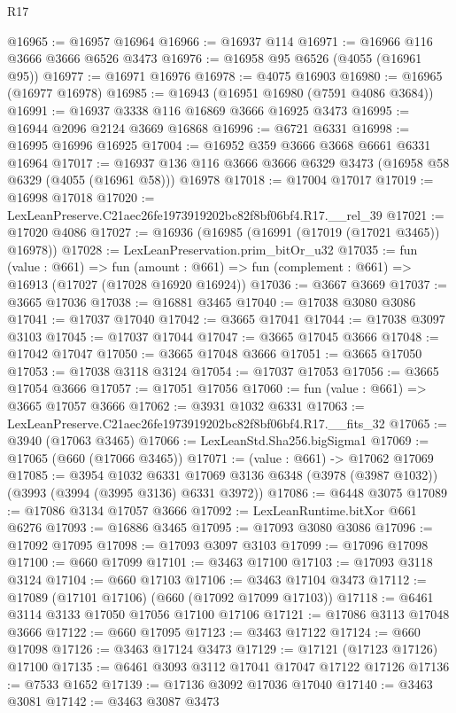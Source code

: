 \begin{lexlean}{R17}
\begin{coremodule}
@16965 := @16957 @16964
@16966 := @16937 @114
@16971 := @16966 @116 @3666 @3666 @6526 @3473
@16976 := @16958 @95 @6526 (@4055 (@16961 @95))
@16977 := @16971 @16976
@16978 := @4075 @16903
@16980 := @16965 (@16977 @16978)
@16985 := @16943 (@16951 @16980 (@7591 @4086 @3684))
@16991 := @16937 @3338 @116 @16869 @3666 @16925 @3473
@16995 := @16944 @2096 @2124 @3669 @16868
@16996 := @6721 @6331
@16998 := @16995 @16996 @16925
@17004 := @16952 @359 @3666 @3668 @6661 @6331 @16964
@17017 := @16937 @136 @116 @3666 @3666 @6329 @3473 (@16958 @58 @6329 (@4055 (@16961 @58))) @16978
@17018 := @17004 @17017
@17019 := @16998 @17018
@17020 := LexLeanPreserve.C21aec26fe1973919202bc82f8bf06bf4.R17.__rel_39
@17021 := @17020 @4086
@17027 := @16936 (@16985 (@16991 (@17019 (@17021 @3465)) @16978))
@17028 := LexLeanPreservation.prim_bitOr_u32
@17035 := fun (value : @661) =>
  fun (amount : @661) => fun (complement : @661) => @16913 (@17027 (@17028 @16920 @16924))
@17036 := @3667 @3669
@17037 := @3665 @17036
@17038 := @16881 @3465
@17040 := @17038 @3080 @3086
@17041 := @17037 @17040
@17042 := @3665 @17041
@17044 := @17038 @3097 @3103
@17045 := @17037 @17044
@17047 := @3665 @17045 @3666
@17048 := @17042 @17047
@17050 := @3665 @17048 @3666
@17051 := @3665 @17050
@17053 := @17038 @3118 @3124
@17054 := @17037 @17053
@17056 := @3665 @17054 @3666
@17057 := @17051 @17056
@17060 := fun (value : @661) => @3665 @17057 @3666
@17062 := @3931 @1032 @6331
@17063 := LexLeanPreserve.C21aec26fe1973919202bc82f8bf06bf4.R17.__fits_32
@17065 := @3940 (@17063 @3465)
@17066 := LexLeanStd.Sha256.bigSigma1
@17069 := @17065 (@660 (@17066 @3465))
@17071 := (value : @661) -> @17062 @17069
@17085 := @3954
    @1032
    @6331
    @17069
    @3136
    @6348
    (@3978 (@3987 @1032))
    (@3993 (@3994 (@3995 @3136) @6331 @3972))
@17086 := @6448 @3075
@17089 := @17086 @3134 @17057 @3666
@17092 := LexLeanRuntime.bitXor @661 @6276
@17093 := @16886 @3465
@17095 := @17093 @3080 @3086
@17096 := @17092 @17095
@17098 := @17093 @3097 @3103
@17099 := @17096 @17098
@17100 := @660 @17099
@17101 := @3463 @17100
@17103 := @17093 @3118 @3124
@17104 := @660 @17103
@17106 := @3463 @17104 @3473
@17112 := @17089 (@17101 @17106) (@660 (@17092 @17099 @17103))
@17118 := @6461 @3114 @3133 @17050 @17056 @17100 @17106
@17121 := @17086 @3113 @17048 @3666
@17122 := @660 @17095
@17123 := @3463 @17122
@17124 := @660 @17098
@17126 := @3463 @17124 @3473
@17129 := @17121 (@17123 @17126) @17100
@17135 := @6461 @3093 @3112 @17041 @17047 @17122 @17126
@17136 := @7533 @1652
@17139 := @17136 @3092 @17036 @17040
@17140 := @3463 @3081
@17142 := @3463 @3087 @3473

\end{coremodule}
\end{lexlean}
